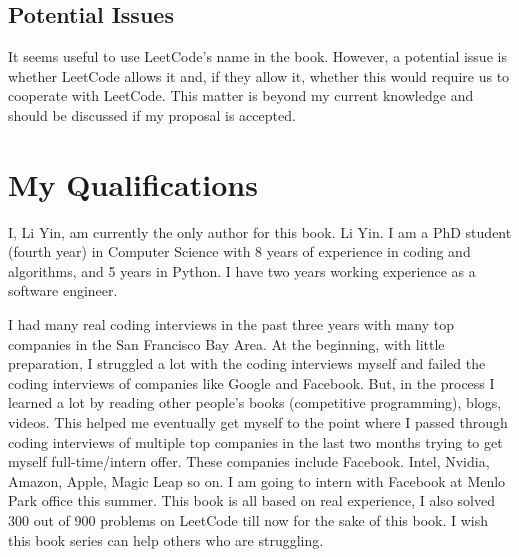 \documentclass[12pt]{article}
\begin{document}






\subsection{Potential Issues}
It seems useful to use LeetCode's name in the book. However, a potential issue is whether LeetCode allows it and, if they allow it, whether this would require us to cooperate with LeetCode. This matter is beyond my current knowledge and should be discussed if my proposal is accepted. 



\section{My Qualifications}
I, Li Yin, am currently the only author for this book. Li Yin. I am a PhD student (fourth year) in Computer Science with 8 years of experience in coding and algorithms, and 5 years in Python. I have two years working experience as a software engineer.  

I had many real coding interviews in the past three years with many top companies in the San Francisco Bay Area. At the beginning, with little preparation, I struggled a lot with the coding interviews myself and failed the coding interviews of companies like Google and Facebook. But, in the process I learned a lot by reading other people's books (competitive programming), blogs, videos. This helped me eventually get myself to the point where I passed through coding interviews of multiple top companies in the last two months trying to get myself full-time/intern offer. These companies include Facebook. Intel, Nvidia, Amazon, Apple, Magic Leap so on. I am going to intern with Facebook at Menlo Park office this summer. This book is all based on real experience, I also solved 300 out of 900 problems on LeetCode till now for the sake of this book. I wish this book series can help others who are struggling. 
\end{document}
